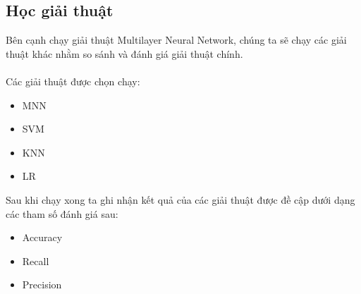 \subsection{Học giải thuật}
Bên cạnh chạy giải thuật Multilayer Neural Network, chúng ta sẽ chạy các giải 
thuật khác nhằm so sánh và đánh giá giải thuật chính.\\\\
Các giải thuật được chọn chạy:
\begin{itemize}
\item MNN
\item SVM
\item KNN
\item LR
\end{itemize}
Sau khi chạy xong ta ghi nhận kết quả của các giải thuật được đề cập dưới dạng 
các tham số đánh giá sau:
\begin{itemize}
\item Accuracy
\item Recall
\item Precision
\end{itemize}
